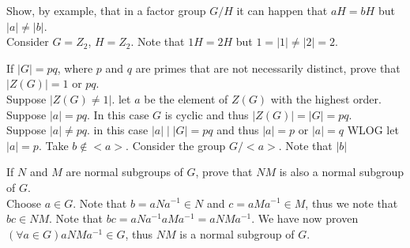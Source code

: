 \documentclass[12pt]{article}
\makeatletter
\theoremstyle{homework}
\newenvironment{exercise}[1]
{\def\@currentlabel{#1}\exercisecore}
{\endexercisecore}
\makeatother
\begin{document}
\begin{exercise}{9.43}
Show, by example, that in a factor group $G/H$ it can happen that $aH = bH$ but $|a| \neq |b|$.\\
Consider $G=Z_2$, $H=Z_2$.  Note that $1H=2H$ but $1=|1|\neq |2|=2$.
\end{exercise}

\begin{exercise}{9.50}
If $|G| = pq$, where $p$ and $q$ are primes that are not necessarily distinct, prove that $|Z(G)| = 1$ or $pq$.\\
Suppose $|Z(G)\neq 1|$.  let $a$ be the element of $Z(G)$ with the highest order.\\
Suppose $|a|=pq$. In this case $G$ is cyclic and thus $|Z(G)|=|G|=pq$.\\
Suppose $|a|\neq pq$.  in this case $|a|\mid |G|=pq$ and thus $|a|=p$ or $|a|=q$ WLOG let $|a|=p$.  Take $b\not \in <a>$.  Consider the group $G/<a>$.  Note that $|b|$
\end{exercise}

\begin{exercise}{9.58}
If $N$ and $M$ are normal subgroups of $G$, prove that $NM$ is also a normal subgroup of $G$.\\
Choose $a\in G$.  Note that $b=aNa^{-1}\in N$ and $c=aMa^{-1}\in M$, thus we note that $bc\in NM$.  Note that $bc=aNa^{-1}aMa^{-1}=aNMa^{-1}$.  We have now proven $(\forall a\in G) aNMa^{-1}\in G$, thus $NM$ is a normal subgroup of $G$.
\end{exercise}
\end{document}
